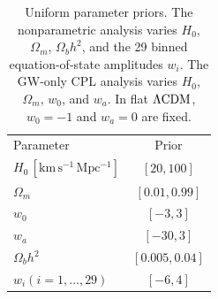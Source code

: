 \begin{table}[t]
 \caption{Uniform parameter priors. The nonparametric analysis varies
 $H_0$, $\Omega_m$, $\Omega_b h^2$, and the 29 binned equation-of-state
 amplitudes $w_i$. The GW-only CPL analysis varies $H_0$, $\Omega_m$,
 $w_0$, and $w_a$. In flat $\Lambda\mathrm{CDM}$, $w_0=-1$ and $w_a=0$ are fixed.}
 \label{tab:parameters_priors}
 \centering
 \small
 \renewcommand{\arraystretch}{1.2}
 \setlength{\tabcolsep}{8pt}
 \begin{ruledtabular}
 \begin{tabular}{lc}
 Parameter & Prior \\
 \colrule
 $H_0\,[\mathrm{km\,s^{-1}\,Mpc^{-1}}]$ & $[20,100]$ \\
 $\Omega_m$ & $[0.01,0.99]$ \\
 $w_0$ & $[-3,3]$ \\
 $w_a$ & $[-30,3]$ \\
 \colrule
 $\Omega_b h^2$ & $[0.005,0.04]$ \\
 $w_i (i=1,\ldots,29)$ & $[-6,4]$ \\
 \end{tabular}
 \end{ruledtabular}
\end{table}
